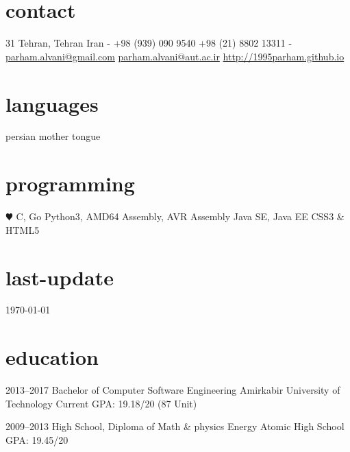 \documentclass[]{friggeri-cv} %
\begin{document}


\begin{aside} %
\section{contact}
31
Tehran, Tehran
Iran
-
+98 (939) 090 9540
+98 (21) 8802 13311
-
\href{mailto:parham.alvani@gmail.com}{parham.alvani@gmail.com}
\href{mailto:parham.alvani@aut.ac.ir}{parham.alvani@aut.ac.ir}
\href{http://1995parham.github.io/}{http://1995parham.github.io}
\section{languages}
persian mother tongue
\section{programming}
{\color{red} $\varheartsuit$} C, Go
Python3, AMD64 Assembly, AVR Assembly
Java SE, Java EE
CSS3 \& HTML5
\section{last-update}
\today
\end{aside}


\section{education}

\begin{entrylist}


\entry
{2013--2017}
{Bachelor {\normalfont of Computer Software Engineering}}
{Amirkabir University of Technology}
{Current GPA: 19.18/20 (87 Unit)}


\entry
{2009--2013}
{High School, {\normalfont Diploma of Math \& physics}}
{Energy Atomic High School}
{GPA: 19.45/20}



\end{entrylist}
\end{document}
